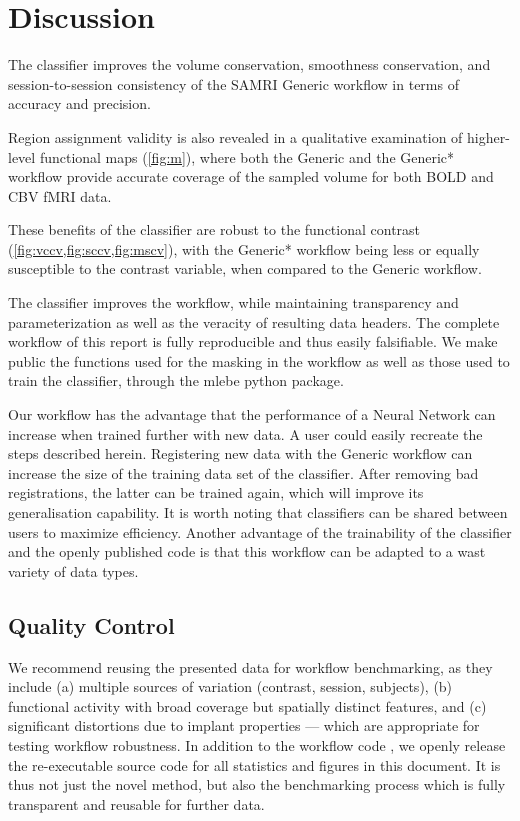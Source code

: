 \section{Discussion}

The classifier improves the volume conservation, smoothness conservation, and session-to-session consistency of the SAMRI Generic workflow in terms of accuracy and precision.

Region assignment validity is also revealed in a qualitative examination of higher-level functional maps (\cref{fig:m}), where both the Generic and the Generic* workflow provide accurate coverage of the sampled volume for both BOLD and CBV fMRI data.

These benefits of the classifier are robust to the functional contrast (\cref{fig:vccv,fig:sccv,fig:mscv}), with the Generic* workflow being less or equally susceptible to the contrast variable, when compared to the Generic workflow.

The classifier improves the workflow, while maintaining transparency and parameterization as well as the veracity of resulting data headers.
The complete workflow of this report is fully reproducible and thus easily falsifiable.
We make public the functions used for the masking in the workflow as well as those used to train the classifier, through the mlebe python package.

Our workflow has the advantage that the performance of a Neural Network can increase when trained further with new data.
A user could easily recreate the steps described herein.
Registering new data with the Generic workflow can increase the size of the training data set of the classifier.
After removing bad registrations, the latter can be trained again, which will improve its generalisation capability.
It is worth noting that classifiers can be shared between users to maximize efficiency.
Another advantage of the trainability of the classifier and the openly published code is that this workflow can be adapted to a wast variety of data types.

\subsection{Quality Control}

We recommend reusing the presented data for workflow benchmarking, as they include (a) multiple sources of variation (contrast, session, subjects), (b) functional activity with broad coverage but spatially distinct features, and (c) significant distortions due to implant properties --- which are appropriate for testing workflow robustness.
In addition to the workflow code \cite{samri}, we openly release the re-executable source code \cite{source} for all statistics and figures in this document.
It is thus not just the novel method, but also the benchmarking process which is fully transparent and reusable for further data.

